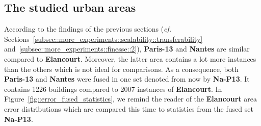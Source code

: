     \subsection{The studied urban areas}
        \label{subsec::more_experiments::classifier::dataset}
        According to the findings of the previous sections (\textit{cf.} Sections~\ref{subsec::more_experiments::scalability::transferability} and~\ref{subsec::more_experiments::finesse::2}), \textbf{Paris-13} and \textbf{Nantes} are similar compared to \textbf{Elancourt}.
        Moreover, the latter area contains a lot more instances than the others which is not ideal for comparisons.
        As a consequence, both \textbf{Paris-13} and \textbf{Nantes} were fused in one set denoted from now by \textbf{Na-P13}.
        It contains 1226 buildings compared to 2007 instances of \textbf{Elancourt}.
        In Figure~\ref{fig::error_fused_statistics}, we remind the reader of the \textbf{Elancourt} area error distributions which are compared this time to statistics from the fused set \textbf{Na-P13}.\\
    
        \begin{figure}[htpb]
            \centering
        \end{figure}

